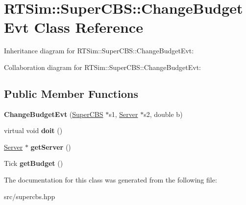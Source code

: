 \hypertarget{classRTSim_1_1SuperCBS_1_1ChangeBudgetEvt}{}\section{R\+T\+Sim\+:\+:Super\+C\+BS\+:\+:Change\+Budget\+Evt Class Reference}
\label{classRTSim_1_1SuperCBS_1_1ChangeBudgetEvt}


Inheritance diagram for R\+T\+Sim\+:\+:Super\+C\+BS\+:\+:Change\+Budget\+Evt\+:


Collaboration diagram for R\+T\+Sim\+:\+:Super\+C\+BS\+:\+:Change\+Budget\+Evt\+:
\subsection*{Public Member Functions}
\begin{DoxyCompactItemize}
\item 
{\bfseries Change\+Budget\+Evt} (\hyperlink{classRTSim_1_1SuperCBS}{Super\+C\+BS} $\ast$s1, \hyperlink{classRTSim_1_1Server}{Server} $\ast$s2, double b)\hypertarget{classRTSim_1_1SuperCBS_1_1ChangeBudgetEvt_a0d5af95071ed6d0702f5fb483bbaebfe}{}\label{classRTSim_1_1SuperCBS_1_1ChangeBudgetEvt_a0d5af95071ed6d0702f5fb483bbaebfe}

\item 
virtual void {\bfseries doit} ()\hypertarget{classRTSim_1_1SuperCBS_1_1ChangeBudgetEvt_abc49af04ba0ccdba0ec201a6cb9bbd42}{}\label{classRTSim_1_1SuperCBS_1_1ChangeBudgetEvt_abc49af04ba0ccdba0ec201a6cb9bbd42}

\item 
\hyperlink{classRTSim_1_1Server}{Server} $\ast$ {\bfseries get\+Server} ()\hypertarget{classRTSim_1_1SuperCBS_1_1ChangeBudgetEvt_a8744e1d5aa0f9bfc28d7e95fe90d6ef5}{}\label{classRTSim_1_1SuperCBS_1_1ChangeBudgetEvt_a8744e1d5aa0f9bfc28d7e95fe90d6ef5}

\item 
Tick {\bfseries get\+Budget} ()\hypertarget{classRTSim_1_1SuperCBS_1_1ChangeBudgetEvt_a96e32e0411a4a15de651b4f4a9bd4630}{}\label{classRTSim_1_1SuperCBS_1_1ChangeBudgetEvt_a96e32e0411a4a15de651b4f4a9bd4630}

\end{DoxyCompactItemize}


The documentation for this class was generated from the following file\+:\begin{DoxyCompactItemize}
\item 
src/supercbs.\+hpp\end{DoxyCompactItemize}
